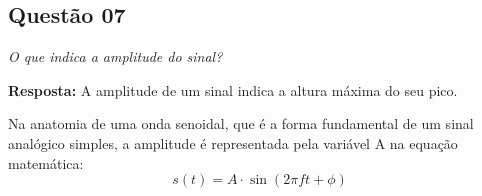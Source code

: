 \subsection*{Questão 07}

\textit{O que indica a amplitude do sinal?}

\textbf{Resposta:} 
A amplitude de um sinal indica a altura máxima do seu pico.

Na anatomia de uma onda senoidal, que é a forma fundamental de um sinal analógico simples,
a amplitude é representada pela variável A na equação matemática:
\begin{equation}
    s(t) = A \cdot \sin(2\pi f t + \phi)
\end{equation}